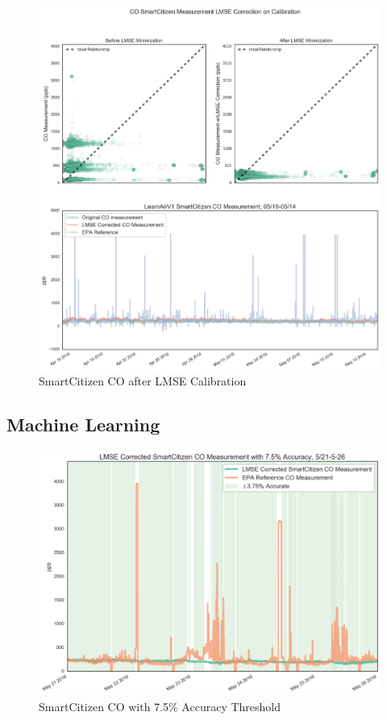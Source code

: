 \begin{figure}[htb]
 	\includegraphics[width=\textwidth]{figs/sck_co_lmse}               
 	 \caption{SmartCitizen CO after LMSE Calibration}
  	\label{fig:sck_co_lmse}
\end{figure}








\subsection{Machine Learning}


\begin{figure}[htb]
 	\includegraphics[width=\textwidth]{figs/sck_co_with_7p5_accuracy_zoomed}               
 	 \caption{SmartCitizen CO with 7.5\% Accuracy Threshold}
  	\label{fig:sck_co_with_7p5_accuracy_zoomed}
\end{figure}

